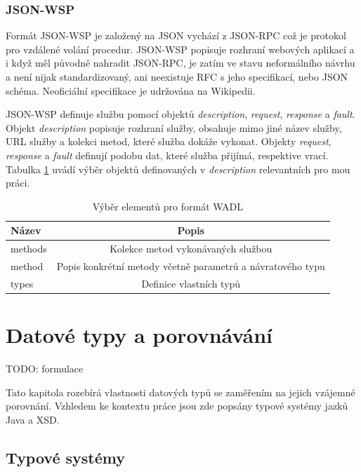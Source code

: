 \documentclass[czech,DP]{thesiskiv}
\begin{document}
\subsection{JSON-WSP}

Formát JSON-WSP je založený na JSON vychází z JSON-RPC což je protokol pro vzdálené volání procedur. JSON-WSP popisuje rozhraní webových aplikací a i když měl původně nahradit JSON-RPC, je zatím ve stavu neformálního návrhu a není nijak standardizovaný, ani neexistuje RFC s jeho specifikací, nebo JSON schéma. Neoficiální specifikace je udržována na Wikipedii\cite{jsonWspSpec}.


JSON-WSP definuje službu pomocí objektů \textit{description}, \textit{request}, \textit{response} a \textit{fault}. Objekt \textit{description} popisuje rozhraní služby, obsahuje mimo jiné název služby, URL služby a kolekci metod, které služba dokáže vykonat. Objekty \textit{request}, \textit{response} a \textit{fault} definují podobu dat, které služba přijímá, respektive vrací. Tabulka \ref{tab:jsonwsp-elements} uvádí výběr objektů definovaných v \textit{description} relevantních pro mou práci.

\begin{table}[h]
	\centering
	\begin{tabular}{|l|c|}
		\hline
		Název & Popis \\
		\hline
		\hline
		methods & Kolekce metod vykonávaných službou \\
		\hline
		method & Popis konkrétní metody včetně parametrů a návratového typu \\
		\hline
		types & Definice vlastních typů \\
		\hline
	\end{tabular}
	\caption{Výběr elementů pro formát WADL}
	\label{tab:jsonwsp-elements} 
\end{table}
 
 
\chapter{Datové typy a porovnávání}

TODO: formulace

Tato kapitola rozebírá vlastnosti datových typů se zaměřením na jejich vzájemné porovnání. Vzhledem ke kontextu práce jsou zde popsány typové systémy jazků Java a XSD.

\section{Typové systémy}
\end{document}
